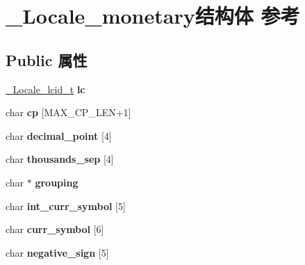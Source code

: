 \hypertarget{struct___locale__monetary}{}\section{\+\_\+\+Locale\+\_\+monetary结构体 参考}
\label{struct___locale__monetary}
\subsection*{Public 属性}
\begin{DoxyCompactItemize}
\item 
\mbox{\label{struct___locale__monetary_a7c638b1755c884feef10ff2c56b0a2d7}} 
\hyperlink{struct___locale__name__hint}{\+\_\+\+Locale\+\_\+lcid\+\_\+t} {\bfseries lc}
\item 
\mbox{\label{struct___locale__monetary_a03c178f8aad4da3b599b8b965d1ebef3}} 
char {\bfseries cp} \mbox{[}M\+A\+X\+\_\+\+C\+P\+\_\+\+L\+EN+1\mbox{]}
\item 
\mbox{\label{struct___locale__monetary_afee66769fd7ea9c23ad13356591925c0}} 
char {\bfseries decimal\+\_\+point} \mbox{[}4\mbox{]}
\item 
\mbox{\label{struct___locale__monetary_a4f07507a787288e037442de87c214de7}} 
char {\bfseries thousands\+\_\+sep} \mbox{[}4\mbox{]}
\item 
\mbox{\label{struct___locale__monetary_ad43bcafe82dba227f5fba2d8abc31574}} 
char $\ast$ {\bfseries grouping}
\item 
\mbox{\label{struct___locale__monetary_ab0ca976d4ba6f47a52153857420d8fc9}} 
char {\bfseries int\+\_\+curr\+\_\+symbol} \mbox{[}5\mbox{]}
\item 
\mbox{\label{struct___locale__monetary_acfa008c7af19169684a6b786699e5e57}} 
char {\bfseries curr\+\_\+symbol} \mbox{[}6\mbox{]}
\item 
\mbox{\label{struct___locale__monetary_aefb7a79e48c60fbc1191467e0711db8d}} 
char {\bfseries negative\+\_\+sign} \mbox{[}5\mbox{]}

\end{DoxyCompactItemize}
